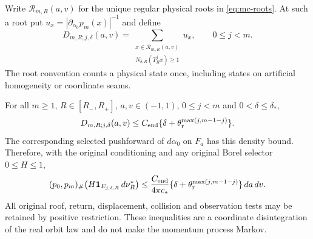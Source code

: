 Write $\mathcal R_{m,R}(a,v)$ for the unique regular physical
roots in \eqref{eq:mc-roots}.  At such a root put
$u_x=|\partial_{\alpha_0}p_m(x)|^{-1}$ and define
\begin{equation}\label{eq:ce-root-kernel}
 D_{m,R;j,\delta}(a,v)
   =\sum_{\substack{x\in\mathcal R_{m,R}(a,v)\\
                         N_{\delta,R}(T_R^jx)\ge1}}u_x,
 \qquad 0\le j<m .
\end{equation}
The root convention counts a physical state once, including
states on artificial homogeneity or coordinate seams.

\begin{theorem}
\label{thm:ce-kernel}
For all $m\ge1$, $R\in[R_-,R_+]$, $a,v\in(-1,1)$,
$0\le j<m$ and $0<\delta\le\delta_*$,
\begin{equation}\label{eq:ce-kernel}
 D_{m,R;j,\delta}(a,v)
       \le C_{\rm end}
          \{\delta+\theta_{\rm r}^{\max(j,m-1-j)}\}.
\end{equation}
The corresponding selected pushforward of $d\alpha_0$ on $F_a$
has this density bound.  Therefore, with the original conditioning
and any original Borel selector $0\le H\le1$,
\begin{equation}\label{eq:ce-joint}
 (p_0,p_m)_\#
   \bigl(H\mathbf1_{E_{j,\delta,R}}\,d\nu_R^*\bigr)
 \le \frac{C_{\rm end}}{4\pi c_*}
       \{\delta+\theta_{\rm r}^{\max(j,m-1-j)}\}\,da\,dv .
\end{equation}
All original roof, return, displacement, collision and observation
tests may be retained by positive restriction.  These inequalities
are a coordinate disintegration of the real orbit law and do not
make the momentum process Markov.
\end{theorem}
